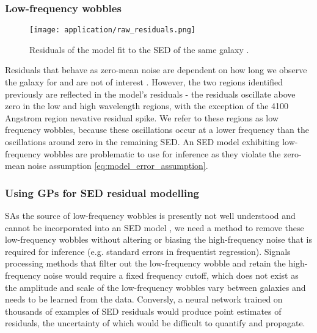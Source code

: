 \subsubsection{Low-frequency wobbles}
\begin{figure}[H]
    \texttt{[image: application/raw\_residuals.png]}
    \caption{Residuals of the model fit to the SED of the same galaxy \cite{galaxy-gp-noise}.}
\end{figure}
Residuals that behave as zero-mean noise are dependent on how long we observe the galaxy for and are not of interest \cite{galaxy-spectra-101}. However, the two regions identified previously are reflected in the model's residuals - the residuals oscillate above zero in the low and high wavelength regions, with the exception of the 4100 Angstrom region nevative residual spike. We refer to these regions as low frequency wobbles, because these oscillations occur at a lower frequency than the oscillations around zero in the remaining SED. An SED model exhibiting low-frequency wobbles are problematic to use for inference as they violate the zero-mean noise assumption \ref{eq:model_error_assumption}. 


\subsubsection{Using GPs for SED residual modelling}
SAs the source of low-frequency wobbles is presently not well understood and cannot be incorporated into an SED model \cite{galaxy-spectra-101}, we need a method to remove these low-frequency wobbles without altering or biasing the high-frequency noise that is required for inference (e.g. standard errors in frequentist regression). Signals processing methods that filter out the low-frequency wobble and retain the high-frequency noise would require a fixed frequency cutoff, which does not exist as the amplitude and scale of the low-frequency wobbles vary between galaxies and needs to be learned from the data. Conversly, a neural network trained on thousands of examples of SED residuals would produce point estimates of residuals, the uncertainty of which would be difficult to quantify and propagate. 

